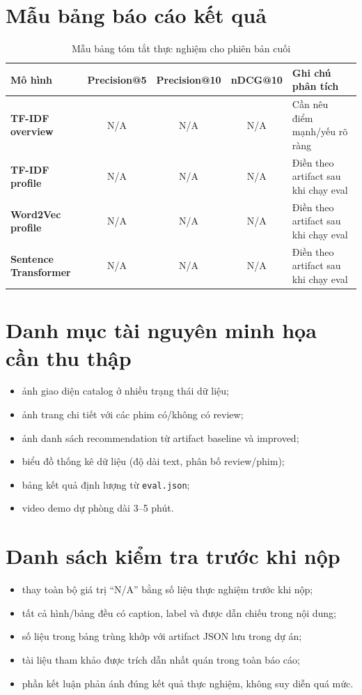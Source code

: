 \section{Mẫu bảng báo cáo kết quả}
\begin{table}[H]
\centering
\caption{Mẫu bảng tóm tắt thực nghiệm cho phiên bản cuối}
\begin{tabularx}{\textwidth}{>{\bfseries}lcccX}
\toprule
Mô hình & Precision@5 & Precision@10 & nDCG@10 & Ghi chú phân tích \\
\midrule
TF-IDF overview & N/A & N/A & N/A & Cần nêu điểm mạnh/yếu rõ ràng \\
TF-IDF profile & N/A & N/A & N/A & Điền theo artifact sau khi chạy eval \\
Word2Vec profile & N/A & N/A & N/A & Điền theo artifact sau khi chạy eval \\
Sentence Transformer & N/A & N/A & N/A & Điền theo artifact sau khi chạy eval \\
\bottomrule
\end{tabularx}
\end{table}

\section{Danh mục tài nguyên minh họa cần thu thập}
\begin{itemize}
    \item ảnh giao diện catalog ở nhiều trạng thái dữ liệu;
    \item ảnh trang chi tiết với các phim có/không có review;
    \item ảnh danh sách recommendation từ artifact baseline và improved;
    \item biểu đồ thống kê dữ liệu (độ dài text, phân bố review/phim);
    \item bảng kết quả định lượng từ \texttt{eval.json};
    \item video demo dự phòng dài 3--5 phút.
\end{itemize}

\section{Danh sách kiểm tra trước khi nộp}
\begin{itemize}
    \item thay toàn bộ giá trị ``N/A'' bằng số liệu thực nghiệm trước khi nộp;
    \item tất cả hình/bảng đều có caption, label và được dẫn chiếu trong nội dung;
    \item số liệu trong bảng trùng khớp với artifact JSON lưu trong dự án;
    \item tài liệu tham khảo được trích dẫn nhất quán trong toàn báo cáo;
    \item phần kết luận phản ánh đúng kết quả thực nghiệm, không suy diễn quá mức.
\end{itemize}
